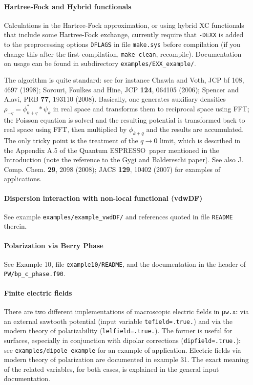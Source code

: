 \documentclass[12pt,a4paper]{article}
\def\qe{{\sc Quantum ESPRESSO}}
\def\pwx{\texttt{pw.x}}
\begin{document}
\paragraph{Hartree-Fock and Hybrid functionals}

Calculations in the Hartree-Fock approximation, or using hybrid XC functionals 
that include some Hartree-Fock exchange, currently require that
\texttt{-DEXX} is added to the preprocessing options \texttt{DFLAGS} in file 
\texttt{make.sys} before compilation (if you change this after the first
compilation, \texttt{make clean}, recompile). 
Documentation on usage can be found in subdirectory 
\texttt{examples/EXX\_example/}.

The algorithm is quite standard: see for instance Chawla and Voth, 
JCP {bf 108}, 4697 (1998); Sorouri, Foulkes and Hine, JCP {\bf 124}, 
064105 (2006); Spencer and Alavi, PRB {\bf 77}, 193110 (2008). 
Basically, one generates auxiliary densities $\rho_{-q}=\phi^{*}_{k+q}*\psi_k$
in real space and transforms them to reciprocal space using FFT;
the Poisson equation is solved and the resulting potential is transformed 
back to real space using FFT, then multiplied by $\phi_{k+q}$ and the
results are accumulated.
The only tricky point is the treatment of the $q\rightarrow 0$ limit,
which is described in the Appendix A.5 of the \qe\ paper mentioned 
in the Introduction (note the reference to the Gygi and Baldereschi paper). 
See also J. Comp. Chem. {\bf 29}, 2098 (2008);
JACS {\bf 129}, 10402 (2007) for examples of applications.

\paragraph{Dispersion interaction with non-local functional (vdwDF)}
See example \texttt{examples/example\_vwdDF/} and references
quoted in file \texttt{README} therein.

\paragraph{Polarization via Berry Phase}
See Example 10, file \texttt{example10/README}, and the documentation 
in the header of \texttt{PW/bp\_c\_phase.f90}. 

\paragraph{Finite electric fields}
There are two different implementations of macroscopic electric fields
in \pwx: via an external sawtooth potential (input variable
\texttt{tefield=.true.}) and via the modern theory of polarizability
(\texttt{lelfield=.true.}).
The former is useful for surfaces, especially in conjunction
with dipolar corrections (\texttt{dipfield=.true.}):
see \texttt{examples/dipole\_example} for an example of application. 
Electric fields via modern theory of polarization are documented in
example 31. The exact meaning of the related variables, for both
cases, is explained in the general input documentation.
\end{document}
